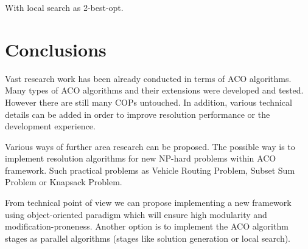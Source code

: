 \documentclass[12pt]{article}
\begin{document}
With local search as 2-best-opt.

\section{Conclusions}

Vast research work has been already conducted in terms of ACO algorithms. Many types of ACO algorithms and their extensions were developed and tested. However there are still many COPs untouched. In addition, various technical details can be added in order to improve resolution performance or the development experience. 

Various ways of further area research can be proposed. The possible way is to implement resolution algorithms for new NP-hard problems within ACO framework. Such practical problems as Vehicle Routing Problem, Subset Sum Problem or Knapsack Problem.

From technical point of view we can propose implementing a new framework using object-oriented paradigm which will ensure high modularity and modification-proneness. Another option is to implement the ACO algorithm stages as parallel algorithms (stages like solution generation or local search). 
\end{document}
